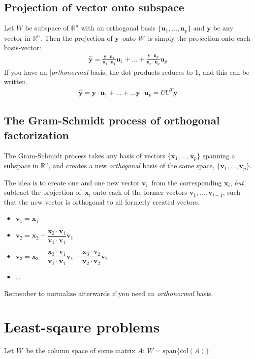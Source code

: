 \documentclass[12p,a4paper]{report}
\renewcommand{\b}{\boldsymbol}
\newcommand{\m}{\mathbb}
\begin{document}
\subsection{Projection of vector onto subspace}
Let $W$ be subspace of $\m R^n$ with an orthogonal basis $\{\b u_1, \dots, \b u_p\}$ and $\b y$ be any vector in $\m R^n$. Then the projection of $\b y$ onto $W$ is simply the projection onto each basis-vector:
\begin{align*}
    \hat{\b y} = \frac{\b y \cdot \b u_1}{\b u_1 \cdot \b u_1}\b u_1 + \dots + \frac{\b y \cdot \b u_p}{\b u_p \cdot \b u_p}\b u_p
\end{align*}
If you have an |\textit{orthonormal} basis, the dot products reduces to $1$, and this can be written.
\begin{align*}
    \hat{\b y} = \b y\cdot \b u_1 + \dots + \dots \b y \cdot \b u_p = U U^T \b y
\end{align*}


\subsection{The Gram-Schmidt process of orthogonal factorization}
The Gram-Schmidt process takes any basis of vectors $\{\b x_1, \dots, \b x_p\}$ spanning a subspace in $\m R^n$, and creates a new \textit{orthogonal} basis of the same space, $\{\b v_1, \dots, \b v_p\}$.

The idea is to create one and one new vector $\b v_i$ from the corresponding $\b x_i$, \textit{but} subtract the projection of $\b x_i$ onto each of the former vectors $\b v_1, \dots, \b v_{i-1}$, such that the new vector is orthogonal to all formerly created vectors.
\begin{itemize}
    \item $\b v_1 = \b x_1$
    \item $\b v_2 = \b x_2 - \dfrac{\b x_2 \cdot \b v_1}{\b v_1 \cdot \b v_1}\b v_1$
    \item $\b v_3 = \b x_3 - \dfrac{\b x_3 \cdot \b v_1}{\b v_1 \cdot \b v_1}\b v_1
     - \dfrac{\b x_3 \cdot \b v_2}{\b v_2 \cdot \b v_2}\b v_2$
    \item \dots
\end{itemize}

Remember to normalize afterwards if you need an \textit{orthonormal} basis.



\section{Least-sqaure problems}
Let $W$ be the column space of some matrix $A$: $W = \text{span}\{\text{col}(A)\}$.
\end{document}
